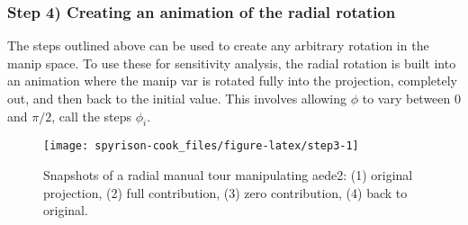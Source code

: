 \hypertarget{step-4-creating-an-animation-of-the-radial-rotation}{%
\subsubsection{Step 4) Creating an animation of the radial
rotation}\label{step-4-creating-an-animation-of-the-radial-rotation}}

The steps outlined above can be used to create any arbitrary rotation in
the manip space. To use these for sensitivity analysis, the radial
rotation is built into an animation where the manip var is rotated fully
into the projection, completely out, and then back to the initial value.
This involves allowing \(\phi\) to vary between \(0\) and \(\pi/2\),
call the steps \(\phi_i\).

\begin{Schunk}
\begin{figure}

{\centering \texttt{[image: spyrison-cook\_files/figure-latex/step3-1]} 

}

\caption[Snapshots of a radial manual tour manipulating aede2]{Snapshots of a radial manual tour manipulating aede2: (1) original projection, (2) full contribution, (3) zero contribution, (4) back to original. }\label{fig:step3}
\end{figure}
\end{Schunk}

